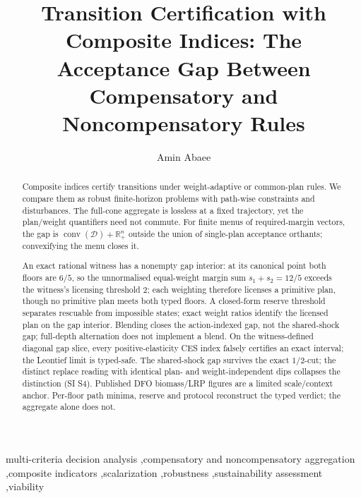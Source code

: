 \documentclass[preprint,11pt,authoryear]{elsarticle}
\theoremstyle{definition}
\theoremstyle{remark}
\newcommand{\conv}{\operatorname{conv}}
\newcommand{\Rp}{\mathbb{R}^n_+}
\begin{document}
\begin{frontmatter}

\title{Transition Certification with Composite Indices: The Acceptance Gap Between Compensatory and Noncompensatory Rules}

\author[1]{Amin Abaee}

\begin{abstract}
Composite indices certify transitions under weight-adaptive or common-plan rules. We compare them as robust finite-horizon problems with path-wise constraints and disturbances. The full-cone aggregate is lossless at a fixed trajectory, yet the plan/weight quantifiers need not commute. For finite menus of required-margin vectors, the gap is $\conv(\mathcal D)+\Rp$ outside the union of single-plan acceptance orthants; convexifying the menu closes it.

An exact rational witness has a nonempty gap interior: at its canonical point both floors are $6/5$, so the unnormalised equal-weight margin sum $s_1+s_2=12/5$ exceeds the witness's licensing threshold $2$; each weighting therefore licenses a primitive plan, though no primitive plan meets both typed floors. A closed-form reserve threshold separates rescuable from impossible states; exact weight ratios identify the licensed plan on the gap interior. Blending closes the action-indexed gap, not the shared-shock gap; full-depth alternation does not implement a blend. On the witness-defined diagonal gap slice, every positive-elasticity CES index falsely certifies an exact interval; the Leontief limit is typed-safe. The shared-shock gap survives the exact $1/2$-cut; the distinct replace reading with identical plan- and weight-independent dips collapses the distinction (SI S4). Published DFO biomass/LRP figures are a limited scale/context anchor. Per-floor path minima, reserve and protocol reconstruct the typed verdict; the aggregate alone does not.
\end{abstract}

\begin{keyword}
multi-criteria decision analysis \sep compensatory and noncompensatory aggregation \sep composite indicators \sep scalarization \sep robustness \sep sustainability assessment \sep viability
\end{keyword}

\end{frontmatter}
\end{document}
